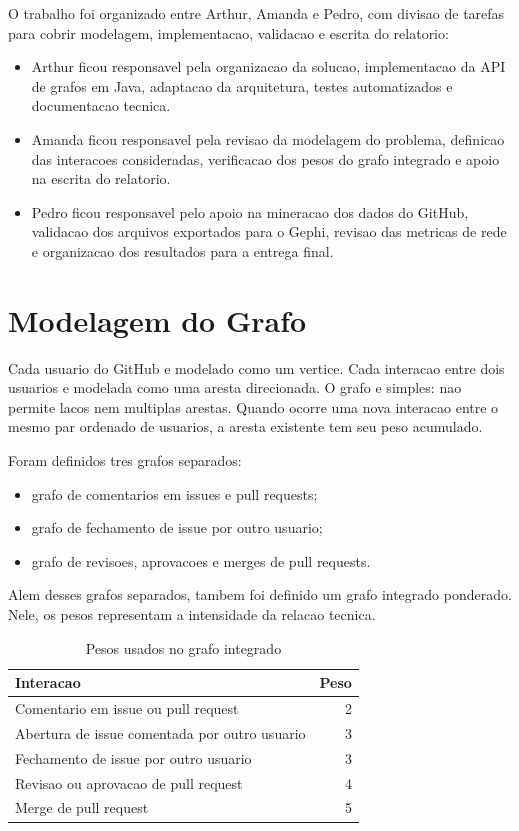 \documentclass[12pt]{article}
\begin{document}
O trabalho foi organizado entre Arthur, Amanda e Pedro, com divisao de tarefas
para cobrir modelagem, implementacao, validacao e escrita do relatorio:

\begin{itemize}
  \item Arthur ficou responsavel pela organizacao da solucao, implementacao da
  API de grafos em Java, adaptacao da arquitetura, testes automatizados e
  documentacao tecnica.
  \item Amanda ficou responsavel pela revisao da modelagem do problema,
  definicao das interacoes consideradas, verificacao dos pesos do grafo
  integrado e apoio na escrita do relatorio.
  \item Pedro ficou responsavel pelo apoio na mineracao dos dados do GitHub,
  validacao dos arquivos exportados para o Gephi, revisao das metricas de rede
  e organizacao dos resultados para a entrega final.
\end{itemize}

\section{Modelagem do Grafo}

Cada usuario do GitHub e modelado como um vertice. Cada interacao entre dois
usuarios e modelada como uma aresta direcionada. O grafo e simples: nao permite
lacos nem multiplas arestas. Quando ocorre uma nova interacao entre o mesmo par
ordenado de usuarios, a aresta existente tem seu peso acumulado.

Foram definidos tres grafos separados:

\begin{itemize}
  \item grafo de comentarios em issues e pull requests;
  \item grafo de fechamento de issue por outro usuario;
  \item grafo de revisoes, aprovacoes e merges de pull requests.
\end{itemize}

Alem desses grafos separados, tambem foi definido um grafo integrado
ponderado. Nele, os pesos representam a intensidade da relacao tecnica.

\begin{table}[H]
\centering
\caption{Pesos usados no grafo integrado}
\begin{tabular}{lr}
\hline
Interacao & Peso \\
\hline
Comentario em issue ou pull request & 2 \\
Abertura de issue comentada por outro usuario & 3 \\
Fechamento de issue por outro usuario & 3 \\
Revisao ou aprovacao de pull request & 4 \\
Merge de pull request & 5 \\
\hline
\end{tabular}
\end{table}
\end{document}
